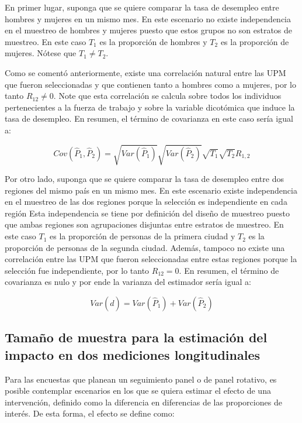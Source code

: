 \documentclass[
  12pt,
]{book}
\begin{document}
En primer lugar, suponga que se quiere comparar la tasa de desempleo entre hombres y mujeres en un mismo mes. En este escenario no existe independencia en el muestreo de hombres y mujeres puesto que estos grupos no son estratos de muestreo. En este caso \(T_1\) es la proporción de hombres y \(T_2\) es la proporción de mujeres. Nótese que \(T_1 \neq T_2\).

Como se comentó anteriormente, existe una correlación natural entre las UPM que fueron seleccionadas y que contienen tanto a hombres como a mujeres, por lo tanto \(R_{12} \neq 0\). Note que esta correlación se calcula sobre todos los individuos pertenecientes a la fuerza de trabajo y sobre la variable dicotómica que induce la tasa de desempleo. En resumen, el término de covarianza en este caso sería igual a:

\[
Cov(\hat{P}_1, \hat{P}_2) = \sqrt{Var(\hat{P}_1)}\sqrt{Var(\hat{P}_2)}\sqrt{T_1}\sqrt{T_2}R_{1,2}
\]

Por otro lado, suponga que se quiere comparar la tasa de desempleo entre dos regiones del mismo país en un mismo mes. En este escenario existe independencia en el muestreo de las dos regiones porque la selección es independiente en cada región Esta independencia se tiene por definición del diseño de muestreo puesto que ambas regiones son agrupaciones disjuntas entre estratos de muestreo. En este caso \(T_1\) es la proporción de personas de la primera ciudad y \(T_2\) es la proporción de personas de la segunda ciudad. Además, tampoco no existe una correlación entre las UPM que fueron seleccionadas entre estas regiones porque la selección fue independiente, por lo tanto \(R_{12} = 0\). En resumen, el término de covarianza es nulo y por ende la varianza del estimador sería igual a:

\[
Var(\hat{d}) 
= Var(\hat{P}_1) + Var(\hat{P}_2)
\]

\hypertarget{tamauxf1o-de-muestra-para-la-estimaciuxf3n-del-impacto-en-dos-mediciones-longitudinales}{%
\subsection{Tamaño de muestra para la estimación del impacto en dos mediciones longitudinales}\label{tamauxf1o-de-muestra-para-la-estimaciuxf3n-del-impacto-en-dos-mediciones-longitudinales}}

Para las encuestas que planean un seguimiento panel o de panel rotativo, es posible contemplar escenarios en los que se quiera estimar el efecto de una intervención, definido como la diferencia en diferencias de las proporciones de interés. De esta forma, el efecto se define como:
\end{document}
